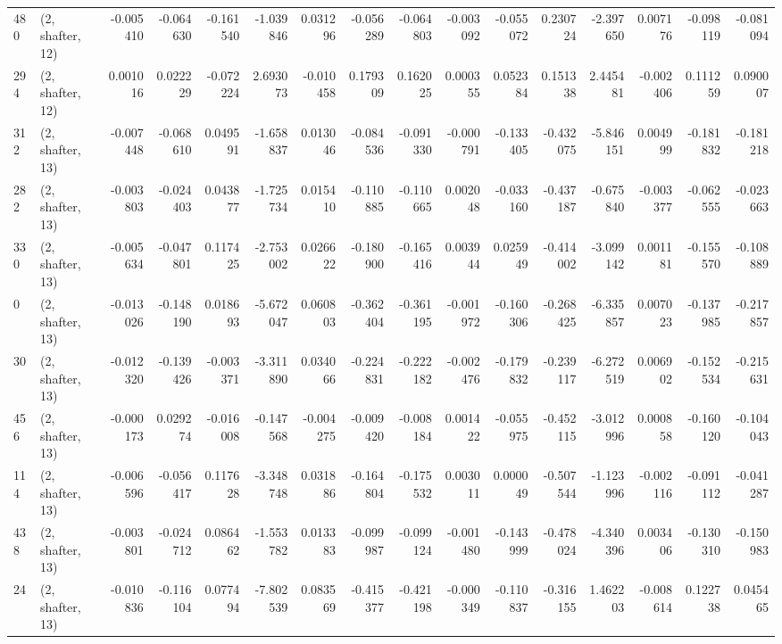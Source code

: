 \begin{tabular}{llrrrrrrrrrrrrrr}
480 &  (2, shafter, 12) &  -0.005410 & -0.064630 & -0.161540 &   -1.039846 &  0.031296 &  -0.056289 & -0.064803 & -0.003092 & -0.055072 &  0.230724 &   -2.397650 &  0.007176 & -0.098119 & -0.081094 \\
294 &  (2, shafter, 12) &   0.001016 &  0.022229 & -0.072224 &    2.693073 & -0.010458 &   0.179309 &  0.162025 &  0.000355 &  0.052384 &  0.151338 &    2.445481 & -0.002406 &  0.111259 &  0.090007 \\
312 &  (2, shafter, 13) &  -0.007448 & -0.068610 &  0.049591 &   -1.658837 &  0.013046 &  -0.084536 & -0.091330 & -0.000791 & -0.133405 & -0.432075 &   -5.846151 &  0.004999 & -0.181832 & -0.181218 \\
282 &  (2, shafter, 13) &  -0.003803 & -0.024403 &  0.043877 &   -1.725734 &  0.015410 &  -0.110885 & -0.110665 &  0.002048 & -0.033160 & -0.437187 &   -0.675840 & -0.003377 & -0.062555 & -0.023663 \\
330 &  (2, shafter, 13) &  -0.005634 & -0.047801 &  0.117425 &   -2.753002 &  0.026622 &  -0.180900 & -0.165416 &  0.003944 &  0.025949 & -0.414002 &   -3.099142 &  0.001181 & -0.155570 & -0.108889 \\
0   &  (2, shafter, 13) &  -0.013026 & -0.148190 &  0.018693 &   -5.672047 &  0.060803 &  -0.362404 & -0.361195 & -0.001972 & -0.160306 & -0.268425 &   -6.335857 &  0.007023 & -0.137985 & -0.217857 \\
30  &  (2, shafter, 13) &  -0.012320 & -0.139426 & -0.003371 &   -3.311890 &  0.034066 &  -0.224831 & -0.222182 & -0.002476 & -0.179832 & -0.239117 &   -6.272519 &  0.006902 & -0.152534 & -0.215631 \\
456 &  (2, shafter, 13) &  -0.000173 &  0.029274 & -0.016008 &   -0.147568 & -0.004275 &  -0.009420 & -0.008184 &  0.001422 & -0.055975 & -0.452115 &   -3.012996 &  0.000858 & -0.160120 & -0.104043 \\
114 &  (2, shafter, 13) &  -0.006596 & -0.056417 &  0.117628 &   -3.348748 &  0.031886 &  -0.164804 & -0.175532 &  0.003011 &  0.000049 & -0.507544 &   -1.123996 & -0.002116 & -0.091112 & -0.041287 \\
438 &  (2, shafter, 13) &  -0.003801 & -0.024712 &  0.086462 &   -1.553782 &  0.013383 &  -0.099987 & -0.099124 & -0.001480 & -0.143999 & -0.478024 &   -4.340396 &  0.003406 & -0.130310 & -0.150983 \\
24  &  (2, shafter, 13) &  -0.010836 & -0.116104 &  0.077494 &   -7.802539 &  0.083569 &  -0.415377 & -0.421198 & -0.000349 & -0.110837 & -0.316155 &    1.462203 & -0.008614 &  0.122738 &  0.045465 \\

\end{tabular}
